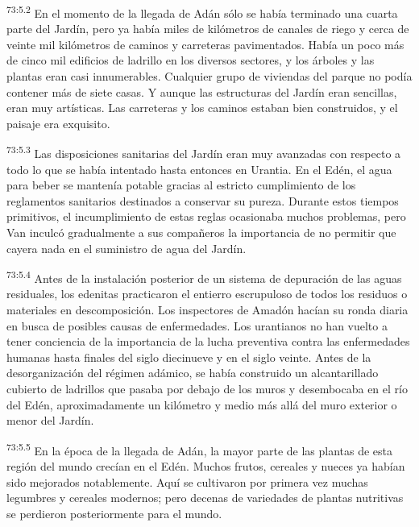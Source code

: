 \par
\textsuperscript{73:5.2} En el momento de la llegada de Adán sólo se había terminado una cuarta parte del Jardín, pero ya había miles de kilómetros de canales de riego y cerca de veinte mil kilómetros de caminos y carreteras pavimentados. Había un poco más de cinco mil edificios de ladrillo en los diversos sectores, y los árboles y las plantas eran casi innumerables. Cualquier grupo de viviendas del parque no podía contener más de siete casas. Y aunque las estructuras del Jardín eran sencillas, eran muy artísticas. Las carreteras y los caminos estaban bien construidos, y el paisaje era exquisito.

\par
\textsuperscript{73:5.3} Las disposiciones sanitarias del Jardín eran muy avanzadas con respecto a todo lo que se había intentado hasta entonces en Urantia. En el Edén, el agua para beber se mantenía potable gracias al estricto cumplimiento de los reglamentos sanitarios destinados a conservar su pureza. Durante estos tiempos primitivos, el incumplimiento de estas reglas ocasionaba muchos problemas, pero Van inculcó gradualmente a sus compañeros la importancia de no permitir que cayera nada en el suministro de agua del Jardín.

\par
\textsuperscript{73:5.4} Antes de la instalación posterior de un sistema de depuración de las aguas residuales, los edenitas practicaron el entierro escrupuloso de todos los residuos o materiales en descomposición. Los inspectores de Amadón hacían su ronda diaria en busca de posibles causas de enfermedades. Los urantianos no han vuelto a tener conciencia de la importancia de la lucha preventiva contra las enfermedades humanas hasta finales del siglo diecinueve y en el siglo veinte. Antes de la desorganización del régimen adámico, se había construido un alcantarillado cubierto de ladrillos que pasaba por debajo de los muros y desembocaba en el río del Edén, aproximadamente un kilómetro y medio más allá del muro exterior o menor del Jardín.

\par
\textsuperscript{73:5.5} En la época de la llegada de Adán, la mayor parte de las plantas de esta región del mundo crecían en el Edén. Muchos frutos, cereales y nueces ya habían sido mejorados notablemente. Aquí se cultivaron por primera vez muchas legumbres y cereales modernos; pero decenas de variedades de plantas nutritivas se perdieron posteriormente para el mundo.

